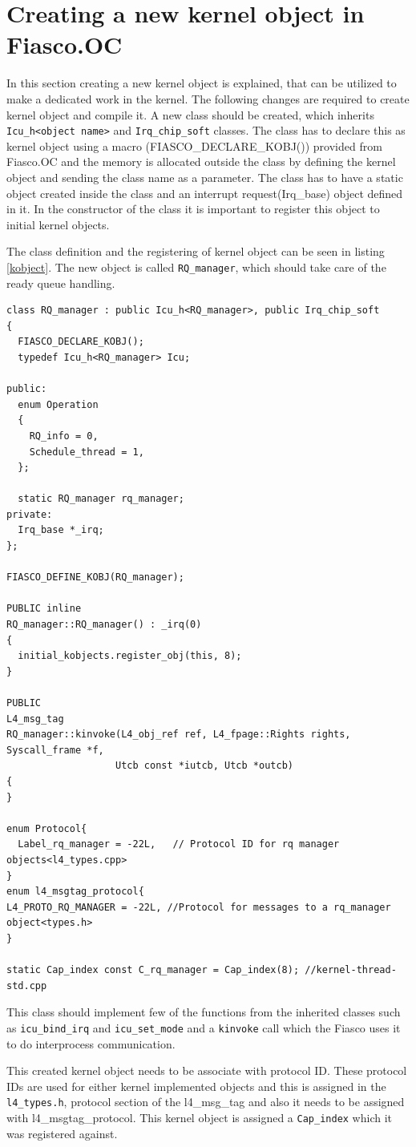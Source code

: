\section{Creating a new kernel object in Fiasco.OC}\label{implement:kernelobject}
In this section creating a new kernel object is explained, that can be utilized to make a dedicated work in the kernel. The following changes are required to create kernel object and compile it. A new class should be created, which inherits \texttt{Icu\_h<object name>} and
\texttt{Irq\_chip\_soft} classes. The class has to declare this as kernel object using a macro (FIASCO\_DECLARE\_KOBJ()) provided from Fiasco.OC and the memory is allocated outside the class by defining the kernel object and sending the class name as a parameter. The class has to have a static object created inside the class and an interrupt request(Irq\_base) object defined in it. In the constructor of the class it is important to register this object to initial kernel objects. 

The class definition and the registering of kernel object can be seen in listing \ref{kobject}. The new object is called \texttt{RQ\_manager}, which should take care of the ready queue handling.

\begin{lstlisting}[caption={Creating new kernel object},label=kobject, style=customcpp]
class RQ_manager : public Icu_h<RQ_manager>, public Irq_chip_soft
{
  FIASCO_DECLARE_KOBJ();
  typedef Icu_h<RQ_manager> Icu;

public:
  enum Operation
  {
	RQ_info = 0,
	Schedule_thread = 1,
  };

  static RQ_manager rq_manager;
private:
  Irq_base *_irq;
};

FIASCO_DEFINE_KOBJ(RQ_manager);

PUBLIC inline
RQ_manager::RQ_manager() : _irq(0)
{
  initial_kobjects.register_obj(this, 8);
}

PUBLIC
L4_msg_tag
RQ_manager::kinvoke(L4_obj_ref ref, L4_fpage::Rights rights, Syscall_frame *f,
                   Utcb const *iutcb, Utcb *outcb)
{
}

enum Protocol{
  Label_rq_manager = -22L,   // Protocol ID for rq manager objects<l4_types.cpp>
}
enum l4_msgtag_protocol{
L4_PROTO_RQ_MANAGER = -22L, //Protocol for messages to a rq_manager object<types.h>
}

static Cap_index const C_rq_manager = Cap_index(8); //kernel-thread-std.cpp
\end{lstlisting}

This class should implement few of the functions from the inherited classes such as \texttt{icu\_bind\_irq} and \texttt{icu\_set\_mode} and a \texttt{kinvoke} call which the Fiasco uses it to do interprocess communication.

This created kernel object needs to be associate with protocol ID. These protocol IDs are used for either
kernel implemented objects and this is assigned in the \texttt{l4\_types.h}, protocol section of the
l4\_msg\_tag and also it needs to be assigned with l4\_msgtag\_protocol. This kernel object is assigned a \texttt{Cap\_index} which it was registered against.